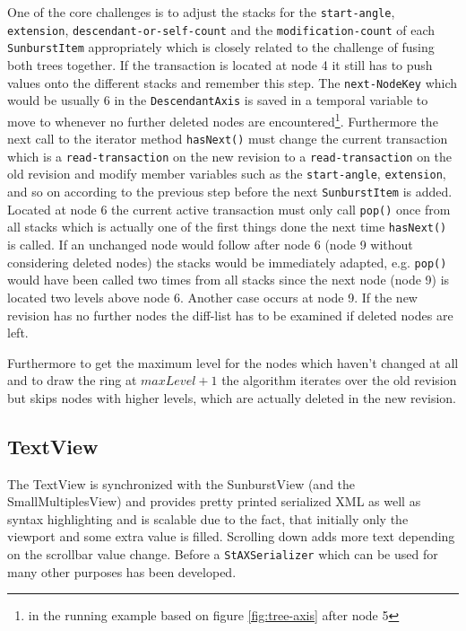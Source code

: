 \documentclass{llncs}
\begin{document}
One of the core challenges is to adjust the stacks for the \texttt{start-angle}, \texttt{extension}, \texttt{descendant-or-self-count} and the \texttt{modification-count} of each \texttt{SunburstItem} appropriately which is closely related to the challenge of fusing both trees together. If the transaction is located at node 4 it still has to push values onto the different stacks and remember this step. The \texttt{next-NodeKey} which would be usually 6 in the \texttt{DescendantAxis} is saved in a temporal variable to move to whenever no further deleted nodes are encountered\footnote{in the running example based on figure \ref{fig:tree-axis} after node 5}. Furthermore the next call to the iterator method \texttt{hasNext()} must change the current transaction which is a \texttt{read-transaction} on the new revision to a \texttt{read-transaction} on the old revision and modify member variables such as the \texttt{start-angle}, \texttt{extension}, and so on according to the previous step before the next \texttt{SunburstItem} is added. Located at node 6 the current active transaction must only call \texttt{pop()} once from all stacks which is actually one of the first things done the next time \texttt{hasNext()} is called. If an unchanged node would follow after node 6 (node 9 without considering deleted nodes) the stacks would be immediately adapted, e.g. \texttt{pop()} would have been called two times from all stacks since the next node (node 9) is located two levels above node 6. Another case occurs at node 9. If the new revision has no further nodes the diff-list has to be examined if deleted nodes are left.

Furthermore to get the maximum level for the nodes which haven't changed at all and to draw the ring at $maxLevel+1$ the algorithm iterates over the old revision but skips nodes with higher levels, which are actually deleted in the new revision.

\subsection{TextView}
The TextView is synchronized with the SunburstView (and the SmallMultiplesView) and provides pretty printed serialized XML as well as syntax highlighting and is scalable due to the fact, that initially only the viewport and some extra value is filled. Scrolling down adds more text depending on the scrollbar value change. Before a \texttt{StAXSerializer} which can be used for many other purposes has been developed.
\end{document}
